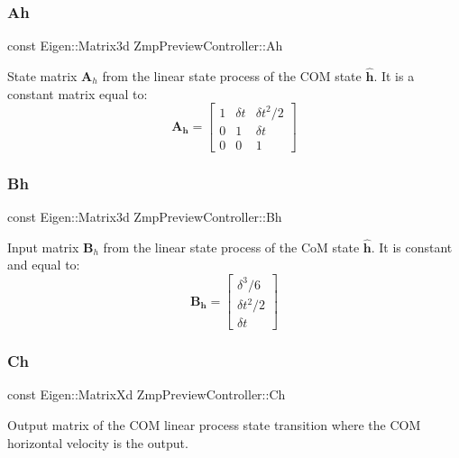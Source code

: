 \subsubsection{\texorpdfstring{Ah}{Ah}}
{\footnotesize\ttfamily const Eigen\+::\+Matrix3d Zmp\+Preview\+Controller\+::\+Ah\hspace{0.3cm}{\ttfamily [private]}}

State matrix $\mathbf{A}_h$ from the linear state process of the C\+OM state $\hat{\mathbf{h}}$. It is a constant matrix equal to\+: \[ \mathbf{A_h} = \left[ \begin{array}{ccc} 1 & \delta t & \delta t^2/2 \\ 0 & 1 & \delta t \\ 0 & 0 & 1 \end{array} \right] \] \hypertarget{classZmpPreviewController_a84edf4d475c32ec836732c24eba30ce9}{}\label{classZmpPreviewController_a84edf4d475c32ec836732c24eba30ce9} 
\subsubsection{\texorpdfstring{Bh}{Bh}}
{\footnotesize\ttfamily const Eigen\+::\+Matrix3d Zmp\+Preview\+Controller\+::\+Bh\hspace{0.3cm}{\ttfamily [private]}}

Input matrix $\mathbf{B}_h$ from the linear state process of the CoM state $\hat{\mathbf{h}}$. It is constant and equal to\+: \[ \mathbf{B_h} = \left[ \begin{array}{c} \delta^3/6 \\ \delta t^2/2 \\ \delta t \end{array} \right] \] \hypertarget{classZmpPreviewController_a2093754713ffb2a7adcd1310c73bf775}{}\label{classZmpPreviewController_a2093754713ffb2a7adcd1310c73bf775} 
\subsubsection{\texorpdfstring{Ch}{Ch}}
{\footnotesize\ttfamily const Eigen\+::\+Matrix\+Xd Zmp\+Preview\+Controller\+::\+Ch\hspace{0.3cm}{\ttfamily [private]}}

Output matrix of the C\+OM linear process state transition where the C\+OM horizontal velocity is the output. \hypertarget{classZmpPreviewController_a1a63870dcc3d51a26c4adc9c97e650ff}{}\label{classZmpPreviewController_a1a63870dcc3d51a26c4adc9c97e650ff} 
